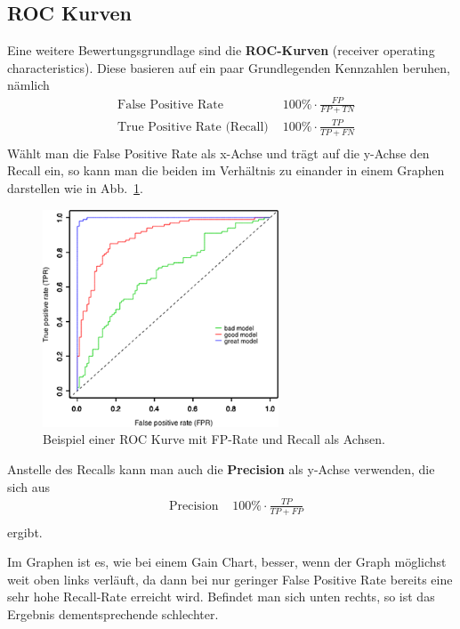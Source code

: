 \subsection{ROC Kurven}
Eine weitere Bewertungsgrundlage sind die \textbf{ROC-Kurven} (receiver operating
characteristics). Diese basieren auf ein paar Grundlegenden Kennzahlen beruhen,
nämlich
\begin{align*}
	&\text{False Positive Rate } &100\% \cdot \frac{FP}{FP+TN}\\
	&\text{True Positive Rate (Recall) } &100\% \cdot \frac{TP}{TP+FN}\\
\end{align*}
Wählt man die False Positive Rate als x-Achse und trägt auf die y-Achse den Recall
ein, so kann man die beiden im Verhältnis zu einander in einem Graphen darstellen
wie in Abb.~\ref{fig:roc}.

\begin{figure}[ht]
	\centering
	\includegraphics[width=0.625\textwidth]{Figures/roc_curve}
	\caption[ROC Curve]{Beispiel einer ROC Kurve mit FP-Rate und Recall als Achsen.\footnotemark}
	\label{fig:roc}
\end{figure}

Anstelle des Recalls kann man auch die \textbf{Precision} als y-Achse verwenden,
die sich aus 
\begin{align*}
&\text{Precision } &100\% \cdot \frac{TP}{TP+FP}\\
\end{align*}
ergibt.

Im Graphen ist es, wie bei einem Gain Chart, besser, wenn der Graph möglichst weit
oben links verläuft, da dann bei nur geringer False Positive Rate bereits eine
sehr hohe Recall-Rate erreicht wird. Befindet man sich unten rechts, so ist das
Ergebnis dementsprechende schlechter.

